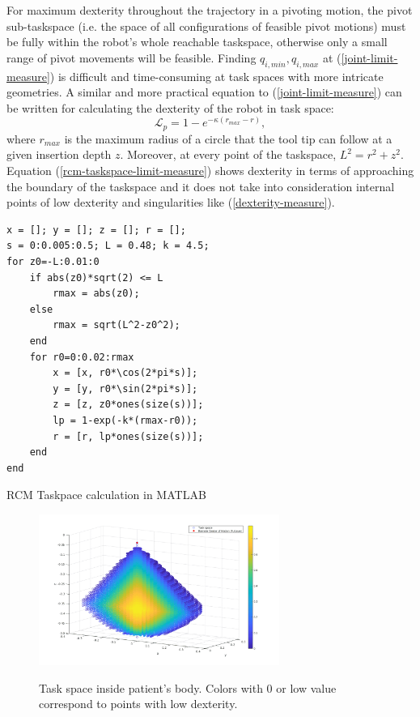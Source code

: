 For maximum dexterity throughout the trajectory in a pivoting motion, the pivot sub-taskspace (i.e. the space of all configurations of feasible pivot motions) must be fully within the robot’s whole reachable taskspace, otherwise only a small range of pivot movements will be 
feasible. 
Finding $q_{i,min}, q_{i,max}$ at (\ref{joint-limit-measure}) is difficult and time-consuming at task spaces with more intricate geometries. A similar and more practical equation to (\ref{joint-limit-measure}) can be written for calculating the dexterity of the robot in task space:
\begin{equation}
\label{rcm-taskspace-limit-measure}
\mathcal{L}_{p}=1-e^{-\kappa (r_{max} - r)},
\end{equation}
where $r_{max}$ is the maximum radius of a circle that the tool tip can follow at a given insertion depth $z$. Moreover, at every point of the taskspace, $L^2 = r^2 + z^2$. Equation (\ref{rcm-taskspace-limit-measure}) shows dexterity in terms of approaching the boundary of the taskspace and it does not take into consideration internal points of low dexterity and singularities like (\ref{dexterity-measure}).

\begin{listing}[H]
\begin{verbatim}
x = []; y = []; z = []; r = [];
s = 0:0.005:0.5; L = 0.48; k = 4.5;
for z0=-L:0.01:0
    if abs(z0)*sqrt(2) <= L
        rmax = abs(z0);
    else
        rmax = sqrt(L^2-z0^2);
    end
    for r0=0:0.02:rmax
        x = [x, r0*\cos(2*pi*s)];
        y = [y, r0*\sin(2*pi*s)];
        z = [z, z0*ones(size(s))];
        lp = 1-exp(-k*(rmax-r0));
        r = [r, lp*ones(size(s))];
    end
end
\end{verbatim}
\caption{RCM Taskpace calculation in MATLAB}
\label{code:rcm_taskspace_matlab}
\end{listing}

\begin{center}
\begin{figure}[htbp]
\centering
\includegraphics[width=0.7\textwidth]{images/rcm_taskspace.png}\\
\caption{Task space inside patient's body. Colors with 0 or low value correspond to points with low dexterity.}
\label{surgical-taskspace}
\end{figure}
\end{center}

